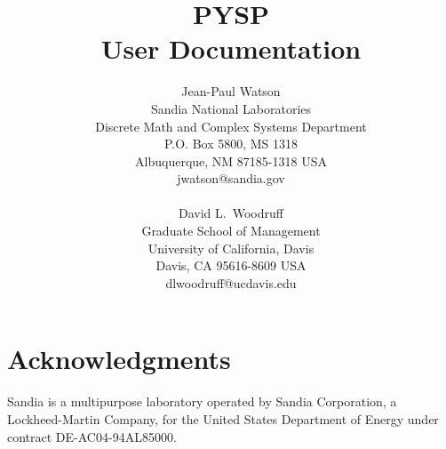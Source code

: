 \documentclass[11pt]{article}
\begin{document}
\title{PYSP \\
User Documentation}

\author{Jean-Paul Watson \\
        Sandia National Laboratories \\
        Discrete Math and Complex Systems Department \\
        P.O. Box 5800, MS 1318 \\
        Albuquerque, NM 87185-1318 USA \\
        jwatson@sandia.gov \\
        \\
        David L.\ Woodruff \\
        Graduate School of Management \\
        University of California, Davis \\
        Davis, CA 95616-8609 USA \\
        dlwoodruff@ucdavis.edu \\
}


\maketitle



{}



\section*{Acknowledgments}

Sandia is a multipurpose laboratory operated by Sandia Corporation, a 
Lockheed-Martin Company, for the United States Department of Energy 
under contract DE-AC04-94AL85000. 
\end{document}
